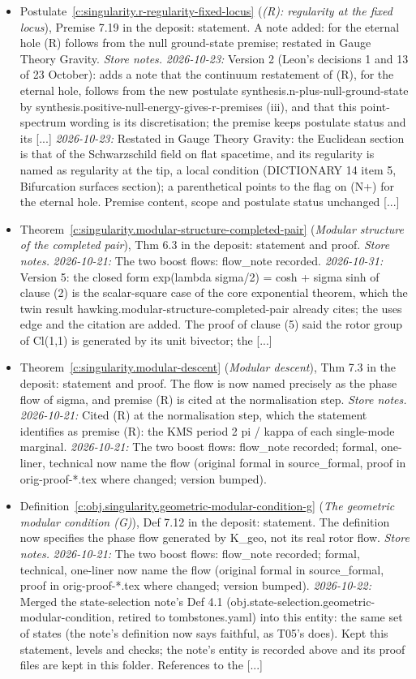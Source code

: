 \documentclass[11pt]{article}
\theoremstyle{definition}
\theoremstyle{plain}
\begin{document}
\begin{itemize}
\item Postulate~\ref{c:singularity.r-regularity-fixed-locus} (\emph{(R): regularity at the fixed locus}), Premise 7.19 in the deposit: statement. A note added: for the eternal hole (R) follows from the null ground-state premise; restated in Gauge Theory Gravity. \emph{Store notes.} \emph{2026-10-23:} Version 2 (Leon's decisions 1 and 13 of 23 October): adds a note that the continuum restatement of (R), for the eternal hole, follows from the new postulate synthesis.n-plus-null-ground-state by synthesis.positive-null-energy-gives-r-premises (iii), and that this point-spectrum wording is its discretisation; the premise keeps postulate status and its [...] \emph{2026-10-23:} Restated in Gauge Theory Gravity: the Euclidean section is that of the Schwarzschild field on flat spacetime, and its regularity is named as regularity at the tip, a local condition (DICTIONARY 14 item 5, Bifurcation surfaces section); a parenthetical points to the flag on (N+) for the eternal hole. Premise content, scope and postulate status unchanged [...]
\item Theorem~\ref{c:singularity.modular-structure-completed-pair} (\emph{Modular structure of the completed pair}), Thm 6.3 in the deposit: statement and proof. \emph{Store notes.} \emph{2026-10-21:} The two boost flows: flow\_note recorded. \emph{2026-10-31:} Version 5: the closed form exp(lambda sigma/2) = cosh + sigma sinh of clause (2) is the scalar-square case of the core exponential theorem, which the twin result hawking.modular-structure-completed-pair already cites; the uses edge and the citation are added. The proof of clause (5) said the rotor group of Cl(1,1) is generated by its unit bivector; the [...]
\item Theorem~\ref{c:singularity.modular-descent} (\emph{Modular descent}), Thm 7.3 in the deposit: statement and proof. The flow is now named precisely as the phase flow of sigma, and premise (R) is cited at the normalisation step. \emph{Store notes.} \emph{2026-10-21:} Cited (R) at the normalisation step, which the statement identifies as premise (R): the KMS period 2 pi / kappa of each single-mode marginal. \emph{2026-10-21:} The two boost flows: flow\_note recorded; formal, one-liner, technical now name the flow (original formal in source\_formal, proof in orig-proof-*.tex where changed; version bumped).
\item Definition~\ref{c:obj.singularity.geometric-modular-condition-g} (\emph{The geometric modular condition (G)}), Def 7.12 in the deposit: statement. The definition now specifies the phase flow generated by K\_geo, not its real rotor flow. \emph{Store notes.} \emph{2026-10-21:} The two boost flows: flow\_note recorded; formal, technical, one-liner now name the flow (original formal in source\_formal, proof in orig-proof-*.tex where changed; version bumped). \emph{2026-10-22:} Merged the state-selection note's Def 4.1 (obj.state-selection.geometric-modular-condition, retired to tombstones.yaml) into this entity: the same set of states (the note's definition now says faithful, as T05's does). Kept this statement, levels and checks; the note's entity is recorded above and its proof files are kept in this folder. References to the [...]

\end{itemize}
\end{document}
